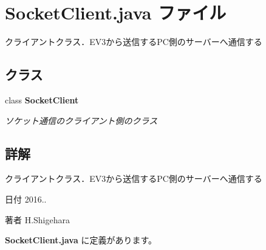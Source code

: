 \section{Socket\-Client.\-java ファイル}
\label{_socket_client_8java}


クライアントクラス．\-E\-V3から送信する\-P\-C側のサーバーへ通信する  


\subsection*{クラス}
\begin{DoxyCompactItemize}
\item 
class {\bf Socket\-Client}
\begin{DoxyCompactList}\small\item\em ソケット通信のクライアント側のクラス \end{DoxyCompactList}\end{DoxyCompactItemize}


\subsection{詳解}
クライアントクラス．\-E\-V3から送信する\-P\-C側のサーバーへ通信する \begin{DoxyDate}{日付}
2016.. 
\end{DoxyDate}
\begin{DoxyAuthor}{著者}
H.\-Shigehara 
\end{DoxyAuthor}


 {\bf Socket\-Client.\-java} に定義があります。


